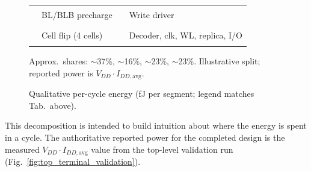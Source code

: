 \documentclass[11pt]{article}
\begin{document}
\begin{figure}[H]
\centering
{}\\[4pt]
{\centering\tiny\setlength{\tabcolsep}{5pt}
\begin{tabular}{@{}c@{\,}l@{\qquad}c@{\,}l@{}}
\textcolor{blue!32}{\rule{8pt}{6pt}} & BL/BLB precharge &
\textcolor{teal!40}{\rule{8pt}{6pt}} & Write driver \\
\textcolor{green!42}{\rule{8pt}{6pt}} & Cell flip (4 cells) &
\textcolor{orange!58}{\rule{8pt}{6pt}} & Decoder, clk, WL, replica, I/O \\
\end{tabular}\par}
{\centering\scriptsize\textcolor{black!55}{Approx.\ shares: $\sim$37\%, $\sim$16\%, $\sim$23\%, $\sim$23\%.
Illustrative split; reported power is $V_{DD}\!\cdot\!I_{DD,\mathrm{avg}}$.}\par}
\caption{Qualitative per-cycle energy (fJ per segment; legend matches Tab.~above).}
\label{fig:energy_split}
\end{figure}

This decomposition is intended to build intuition about where the
energy is spent in a cycle. The authoritative reported power for the
completed design is the measured $V_{DD}\cdot I_{DD,\mathrm{avg}}$
value from the top-level validation run
(Fig.~\ref{fig:top_terminal_validation}).
\end{document}

